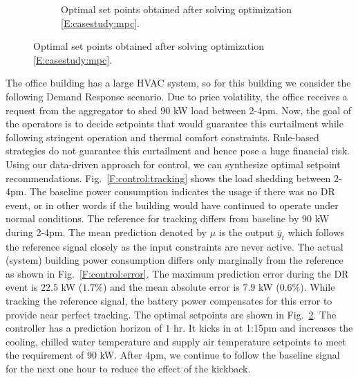 \begin{figure}[t!]
%		
\begin{subfigure}
	\centering
	\setlength{}
	\setlength{}	
		
	\caption{Optimal set points obtained after solving optimization \eqref{E:casestudy:mpc}.}
    \vspace{-10pt}    
	\label{F:control:all}
\end{subfigure}
\end{figure}

The office building has a large HVAC system, so for this building we consider the following Demand Response scenario. 
Due to price volatility, the office receives a request from the aggregator to shed \(90\) kW load between 2-4pm. 
Now, the goal of the operators is to decide setpoints that would guarantee this curtailment while following stringent operation and thermal comfort constraints. 
Rule-based strategies do not guarantee this curtailment and hence pose a huge financial risk. 
Using our data-driven approach for control, we can synthesize optimal setpoint recommendations.
Fig.~\ref{F:control:tracking} shows the load shedding between 2-4pm. 
The baseline power consumption indicates the usage if there was no DR event, or in other words if the building would have continued to operate under normal conditions. The reference for tracking differs from baseline by \(90\) kW during 2-4pm.
The mean prediction denoted by \(\mu\) is the output \(\bar{y}_{t}\) which follows the reference signal closely as the input constraints are never active. The actual (system) building power consumption differs only marginally from the reference as shown in Fig.~\ref{F:control:error}. The maximum prediction error during the DR event is \(22.5\) kW (\(1.7\%\)) and the mean absolute error is \(7.9\) kW (\(0.6\%\)). While tracking the reference signal, the battery power compensates for this error to provide near perfect tracking. The optimal setpoints are shown in Fig.~\ref{F:control:all}. The controller has a prediction horizon of \(1\) hr. It kicks in at 1:15pm and increases the cooling, chilled water temperature and supply air temperature setpoints to meet the requirement of \(90\) kW. After 4pm, we continue to follow the baseline signal for the next one hour to reduce the effect of the kickback.


